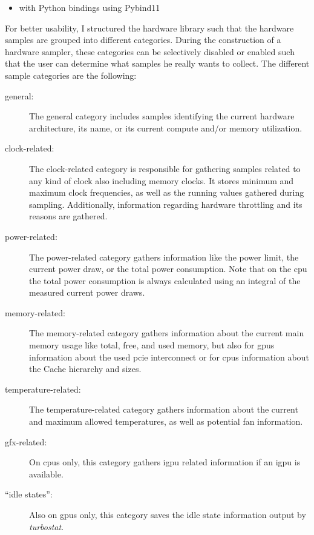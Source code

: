 

\begin{itemize}
    \item \cpp with Python bindings using Pybind11 \cite{jakob_pybind11_2017}
\end{itemize}



For better usability, I structured the hardware library such that the hardware samples are grouped into different categories. 
During the construction of a hardware sampler, these categories can be selectively disabled or enabled such that the user can determine what samples he really wants to collect.
The different sample categories are the following:
\begin{description}
    \item[general:]%
    The general category includes samples identifying the current hardware architecture, its name, or its current compute and/or memory utilization.
    \item[clock-related:]%
    The clock-related category is responsible for gathering samples related to any kind of clock also including memory clocks. 
    It stores minimum and maximum clock frequencies, as well as the running values gathered during sampling. 
    Additionally, information regarding hardware throttling and its reasons are gathered.
    \item[power-related:]%
    The power-related category gathers information like the power limit, the current power draw, or the total power consumption. 
    Note that on the \gls{cpu} the total power consumption is always calculated using an integral of the measured current power draws. 
    \item[memory-related:]%
    The memory-related category gathers information about the current main memory usage like total, free, and used memory, but also for \glspl{gpu} information about the used \gls{pcie} interconnect or for \glspl{cpu} information about the Cache hierarchy and sizes. 
    \item[temperature-related:] The temperature-related category gathers information about the current and maximum allowed temperatures, as well as potential fan information. 
    \item[gfx-related:] On \glspl{cpu} only, this category gathers i\gls{gpu} related information if an i\gls{gpu} is available. 
    \item[\enquote{idle states}:] Also on \glspl{gpu} only, this category saves the idle state information output by \textit{turbostat}.
\end{description}

